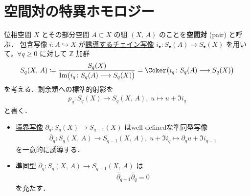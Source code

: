 \documentclass[algtopo_main]{subfiles}
\begin{document}

\section{空間対の特異ホモロジー}

位相空間 $X$ とその部分空間 $A \subset X$ の組 $(X,\, A)$ のことを\textbf{空間対} (pair) と呼ぶ．
包含写像 $i \colon A \hookrightarrow X$ が\hyperref[lem:SC-chain]{誘導するチェイン写像} $i_\bullet \colon S_\bullet (A) \longrightarrow S_\bullet (X)$ を用いて，$\forall q \ge 0$ に対して $\mathbb{Z}$ 加群
\begin{align}
    S_q(X,\, A) \coloneqq \frac{S_q(X)}{\Im \bigl(i_q \colon S_q (A) \lto S_q(X)\bigr)}= \Coker\bigl( i_q\colon S_q(A) \longrightarrow S_q(X) \bigr)
\end{align}
を考える．剰余類への標準的射影を
\begin{align}
    p_q \colon S_q(X) \longrightarrow S_q(X,\, A),\; u \longmapsto u + \Im i_q
\end{align}
と書く．

\begin{mylem}[label=lem:pair-partial]{}
    \begin{itemize}
        \item 
        \hyperref[def:SCC]{境界写像} $\partial_q \colon S_q(X) \longrightarrow S_{q-1}(X)$ はwell-definedな準同型写像
        \begin{align}
            \overline{\partial}_q \colon S_q(X,\, A) \longrightarrow S_{q-1}(X,\, A),\; u + \Im i_q \longmapsto \partial_q u + \Im i_{q-1}
        \end{align}
        を一意的に誘導する．
        \item 
        準同型 $\overline{\partial}_q \colon S_q(X,\, A) \longrightarrow S_{q-1}(X,\, A)$ は
        \begin{align}
            \overline{\partial}_{q-1}\overline{\partial}_q = 0
        \end{align}
        を充たす．
    \end{itemize}
\end{mylem}
\end{document}
